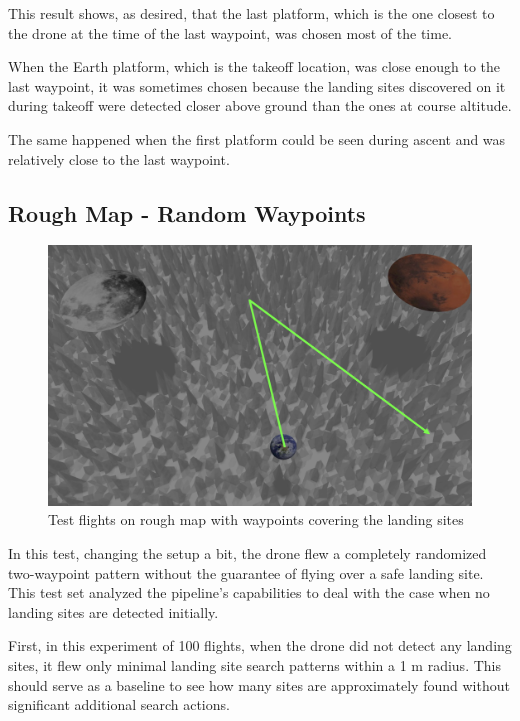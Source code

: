         This result shows, as desired, that the last platform, which is the one closest to the drone at the time of the last waypoint, was chosen most of the time. 
        
        When the Earth platform, which is the takeoff location, was close enough to the last waypoint, it was sometimes chosen because the landing sites discovered on it during takeoff were detected closer above ground than the ones at course altitude.

        The same happened when the first platform could be seen during ascent and was relatively close to the last waypoint.


\subsection{Rough Map - Random Waypoints}\label{subsec:rough_map_rw}

    \begin{figure}[h]
        \centering
        \includegraphics[scale=0.24]{images/evaluation/rough_complete_rand.png}
        \caption{Test flights on rough map with waypoints covering the landing sites}
        \label{fig:rough_compl_rand}
    \end{figure}

    In this test, changing the setup a bit, the drone flew a completely randomized two-waypoint pattern without the guarantee of flying over a safe landing site. This test set analyzed the pipeline's capabilities to deal with the case when no landing sites are detected initially.

    First, in this experiment of 100 flights, when the drone did not detect any landing sites, it flew only minimal landing site search patterns within a 1 m radius. This should serve as a baseline to see how many sites are approximately found without significant additional search actions.

